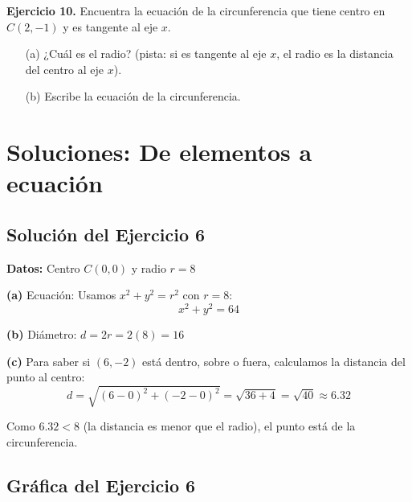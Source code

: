 \documentclass[12pt,a4paper]{article}
\begin{document}
	\bigskip

	\textbf{Ejercicio 10.} Encuentra la ecuación de la circunferencia que tiene centro en $C(2,-1)$ y es tangente al eje $x$.
	\begin{itemize}
		\item[(a)] ¿Cuál es el radio? (pista: si es tangente al eje $x$, el radio es la distancia del centro al eje $x$).
		\item[(b)] Escribe la ecuación de la circunferencia.
	\end{itemize}

	\section{Soluciones: De elementos a ecuación}

	\subsection*{Solución del Ejercicio 6}

	\textbf{Datos:} Centro $C(0,0)$ y radio $r=8$

	\bigskip

	\textbf{(a)} Ecuación: Usamos $x^2+y^2=r^2$ con $r=8$:
	\[
	\boxed{x^2+y^2=64}
	\]

	\textbf{(b)} Diámetro: $d=2r=2(8)=\boxed{16}$

	\textbf{(c)} Para saber si $(6,-2)$ está dentro, sobre o fuera, calculamos la distancia del punto al centro:
	\[
	d=\sqrt{(6-0)^2+(-2-0)^2}=\sqrt{36+4}=\sqrt{40}\approx 6.32
	\]

	Como $6.32<8$ (la distancia es menor que el radio), el punto está  de la circunferencia.

	\subsection*{Gráfica del Ejercicio 6}
\end{document}
